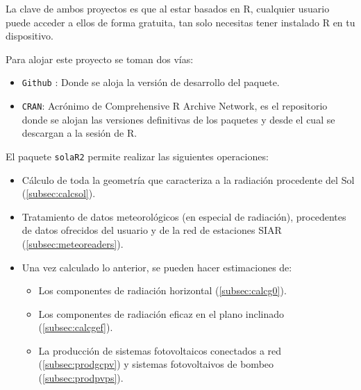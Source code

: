La clave de ambos proyectos es que al estar basados en R, cualquier usuario puede acceder a ellos de forma gratuita, tan solo necesitas tener instalado R en tu dispositivo.

Para alojar este proyecto se toman dos vías:
\begin{itemize}
\item \texttt{Github} \cite{github}: Donde se aloja la versión de desarrollo del paquete.
\item \texttt{CRAN}: Acrónimo de Comprehensive R Archive Network, es el repositorio donde se alojan las versiones definitivas de los paquetes y desde el cual se descargan a la sesión de R.
\end{itemize}

El paquete \texttt{solaR2} permite realizar las siguientes operaciones:
\begin{itemize}
\item Cálculo de toda la geometría que caracteriza a la radiación procedente del Sol (\ref{subsec:calcsol}).
\item Tratamiento de datos meteorológicos (en especial de radiación), procedentes de datos ofrecidos del usuario y de la red de estaciones SIAR \cite{siar23} (\ref{subsec:meteoreaders}).
\item Una vez calculado lo anterior, se pueden hacer estimaciones de:
\begin{itemize}
\item Los componentes de radiación horizontal (\ref{subsec:calcg0}).
\item Los componentes de radiación eficaz en el plano inclinado (\ref{subsec:calcgef}).
\item La producción de sistemas fotovoltaicos conectados a red (\ref{subsec:prodgcpv}) y sistemas fotovoltaivos de bombeo (\ref{subsec:prodpvps}).
\end{itemize}
\end{itemize}

